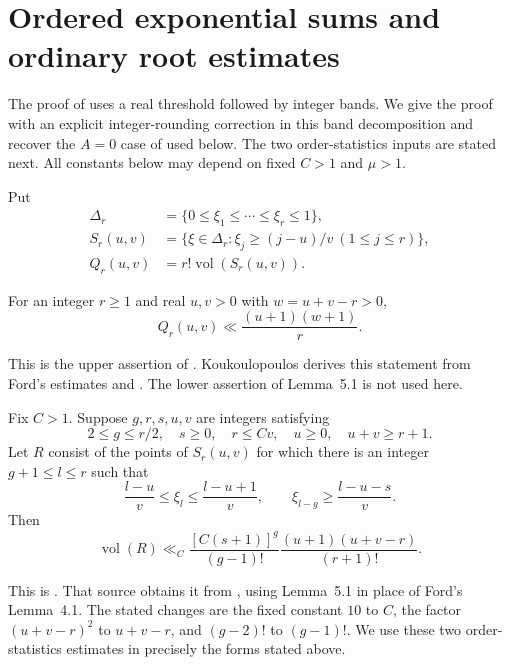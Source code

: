 \section{Ordered exponential sums and ordinary root estimates}
\label{ordsumrepair:section}

The proof of \cite[Lemma~5.3, pp.~31--33]{KoukLocal} uses a real
threshold followed by integer bands. We give the proof with an explicit
integer-rounding correction in this band decomposition and recover the
$A=0$ case of \cite[Lemma~5.5]{Kouk} used below. The two order-statistics
inputs are stated next. All constants below may depend on fixed $C>1$
and $\mu>1$.

Put
\begin{align*}
 \Delta_r&=\{0\leq\xi_1\leq\cdots\leq\xi_r\leq1\},\\
 S_r(u,v)&=\{\xi\in\Delta_r:\xi_j\geq(j-u)/v\ (1\leq j\leq r)\},\\
 Q_r(u,v)&=r!\operatorname{vol}(S_r(u,v)).
\end{align*}

\begin{lemma}
\label{ordsumrepair:flat-input}
For an integer $r\geq1$ and real $u,v>0$ with $w=u+v-r>0$,
\[
 Q_r(u,v)\ll\frac{(u+1)(w+1)}r.
\]
\end{lemma}

This is the upper assertion of \cite[Lemma~5.1, p.~30]{KoukLocal}.
Koukoulopoulos derives this statement from Ford's estimates
\cite[Theorem~1]{FordSmirnov2008} and
\cite[Lemma~11.1]{FordDivisors2008}.
The lower assertion of Lemma~5.1 is not used here.

\begin{lemma}
\label{ordsumrepair:crowding-input}
Fix $C>1$. Suppose $g,r,s,u,v$ are integers satisfying
\[
 2\leq g\leq r/2,\quad s\geq0,\quad r\leq Cv,\quad
 u\geq0,\quad u+v\geq r+1.
\]
Let $R$ consist of the points of $S_r(u,v)$ for which there is an
integer $g+1\leq l\leq r$ such that
\[
 \frac{l-u}{v}\leq\xi_l\leq\frac{l-u+1}{v},\qquad
 \xi_{l-g}\geq\frac{l-u-s}{v}.
\]
Then
\[
 \operatorname{vol}(R)\ll_C
 \frac{[C(s+1)]^g}{(g-1)!}
 \frac{(u+1)(u+v-r)}{(r+1)!}.
\]
\end{lemma}

This is \cite[Lemma~5.2, p.~30]{KoukLocal}. That source obtains it
from \cite[Lemma~4.3]{FordDyadic2008}, using Lemma~5.1 in place of
Ford's Lemma~4.1.
The stated changes are the fixed constant $10$ to $C$, the factor
$(u+v-r)^2$ to $u+v-r$, and $(g-2)!$ to $(g-1)!$.
We use these two order-statistics estimates in precisely the forms
stated above.

